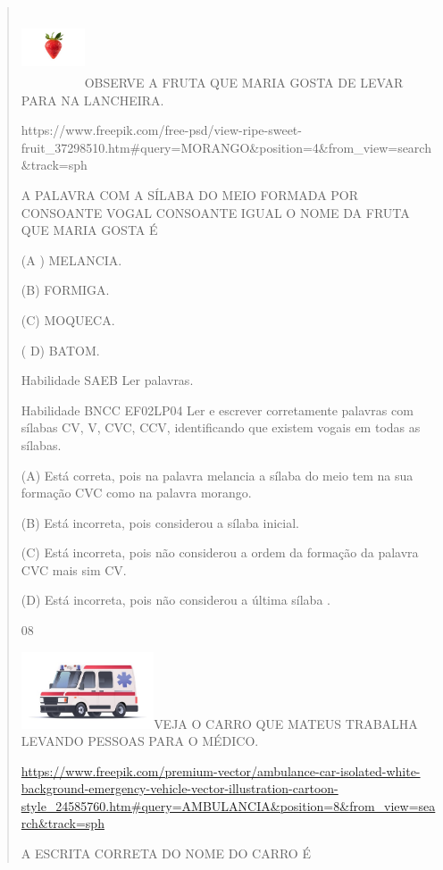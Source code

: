 {{{{\begin{verse}
{{\begin{escolha}
{{{{{\includegraphics[width=0.73819in,height=0.93750in]{media/image152.jpeg}OBSERVE
A FRUTA QUE MARIA GOSTA DE LEVAR PARA NA LANCHEIRA.

https://www.freepik.com/free-psd/view-ripe-sweet-fruit\_37298510.htm\#query=MORANGO\&position=4\&from\_view=search\&track=sph

\protect\hypertarget{_Hlk129368984}{}{}A PALAVRA COM A SÍLABA DO MEIO
FORMADA POR CONSOANTE VOGAL CONSOANTE IGUAL O NOME DA FRUTA QUE MARIA
GOSTA É

(A ) MELANCIA.

(B) FORMIGA.

(C) MOQUECA.

( D) BATOM.

\protect\hypertarget{_Hlk129369076}{}{} Habilidade SAEB Ler palavras.

Habilidade BNCC EF02LP04 Ler e escrever corretamente palavras com
sílabas CV, V, CVC, CCV, identificando que existem vogais em todas as
sílabas.

(A) Está correta, pois na palavra melancia a sílaba do meio tem na sua
formação CVC como na palavra morango.

(B) Está incorreta, pois considerou a sílaba inicial.

(C) Está incorreta, pois não considerou a ordem da formação da palavra
CVC mais sim CV.

(D) Está incorreta, pois não considerou a última sílaba .

\num{08}

\includegraphics[width=1.54514in,height=0.89444in]{media/image153.jpeg}VEJA
O CARRO QUE MATEUS TRABALHA LEVANDO PESSOAS PARA O MÉDICO.

\url{https://www.freepik.com/premium-vector/ambulance-car-isolated-white-background-emergency-vehicle-vector-illustration-cartoon-style_24585760.htm\#query=AMBULANCIA\&position=8\&from_view=search\&track=sph}

A ESCRITA CORRETA DO NOME DO CARRO É

}}}}}
\end{escolha}}}
\end{verse}}}}}
